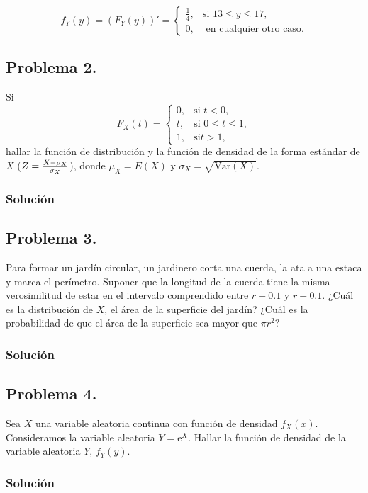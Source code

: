 \documentclass[
]{article}
\begin{document}
\[
f_Y(y)=(F_Y(y))'=
\left\{\begin{array}{ll}
\frac{1}{4}, & \mbox{si } 13\leq y \leq
17,
 \\[0.1cm]
0, & \mbox{ en cualquier otro caso}.
\end{array}\right.
\]

\hypertarget{problema-2.-2}{%
\subsection{Problema 2.}\label{problema-2.-2}}

Si \[
F_X(t)=
\left\{\begin{array}{ll}
0, & \mbox{si $t<0$},\\ t, &
\mbox{si $0\leq t\leq 1$},\\ 1, & \mbox{si
$t>1$},
\end{array}\right.
\] hallar la función de distribución y la función de densidad de la
forma estándar de \(X\) (\(Z={X-\mu_X\over \sigma_X}\)), donde
\(\mu_X =E(X)\) y \(\sigma_X=\sqrt{\mathrm{Var}(X)}\).

\hypertarget{soluciuxf3n-12}{%
\subsubsection{Solución}\label{soluciuxf3n-12}}

\hypertarget{problema-3.-2}{%
\subsection{Problema 3.}\label{problema-3.-2}}

Para formar un jardín circular, un jardinero corta una cuerda, la ata a
una estaca y marca el perímetro. Suponer que la longitud de la cuerda
tiene la misma verosimilitud de estar en el intervalo comprendido entre
\(r-0.1\) y \(r+0.1\). ¿Cuál es la distribución de \(X\), el área de la
superficie del jardín? ¿Cuál es la probabilidad de que el área de la
superficie sea mayor que \(\pi r^2\)?

\hypertarget{soluciuxf3n-13}{%
\subsubsection{Solución}\label{soluciuxf3n-13}}

\hypertarget{problema-4.-2}{%
\subsection{Problema 4.}\label{problema-4.-2}}

Sea \(X\) una variable aleatoria continua con función de densidad
\(f_X(x)\). Consideramos la variable aleatoria \(Y=\mathrm{e}^X\).
Hallar la función de densidad de la variable aleatoria \(Y\),
\(f_Y(y)\).

\hypertarget{soluciuxf3n-14}{%
\subsubsection{Solución}\label{soluciuxf3n-14}}
\end{document}
